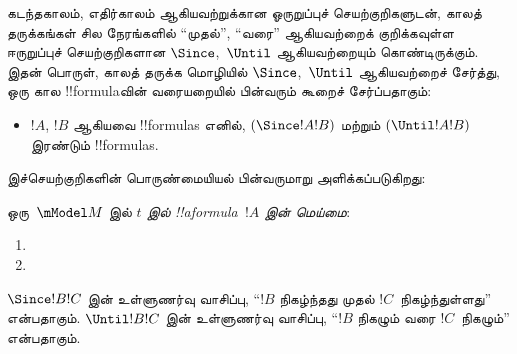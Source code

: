 \documentclass[../../../include/open-logic-section]{subfiles}
\begin{document}


கடந்தகாலம், எதிர்காலம் ஆகியவற்றுக்கான ஓருறுப்புச் செயற்குறிகளுடன், காலத்
தருக்கங்கள் சில நேரங்களில் ``முதல்'', ``வரை'' ஆகியவற்றைக் குறிக்கவுள்ள
ஈருறுப்புச் செயற்குறிகளான $\Since $,~$\Until$ ஆகியவற்றையும் கொண்டிருக்கும்.
இதன் பொருள், காலத் தருக்க மொழியில் $\Since $,~$\Until$ ஆகியவற்றைச் சேர்த்து,
ஒரு கால !!{formula}வின் வரையறையில் பின்வரும் கூறைச் சேர்ப்பதாகும்:

\begin{itemize}
\item[] $!A$, $!B$ ஆகியவை !!{formula}s எனில், $(\Since  !A !B)$ மற்றும்
  $(\Until !A !B)$ இரண்டும் !!{formula}s.
\end{itemize}

இச்செயற்குறிகளின் பொருண்மையியல் பின்வருமாறு அளிக்கப்படுகிறது:

\begin{defn}
  ஒரு~$\mModel M$ இல் \emph{$t$ இல் !!a{formula}~$!A$ இன் மெய்மை}:
  \begin{enumerate}
  \item{} 
   \item{} 
  \end{enumerate}
\end{defn}

$\Since  !B !C$ இன் உள்ளுணர்வு வாசிப்பு, ``$!B$ நிகழ்ந்தது முதல்
$!C$~நிகழ்ந்துள்ளது'' என்பதாகும். $\Until !B !C$ இன் உள்ளுணர்வு வாசிப்பு,
``$!B$ நிகழும் வரை $!C$~நிகழும்'' என்பதாகும்.
\end{document}
